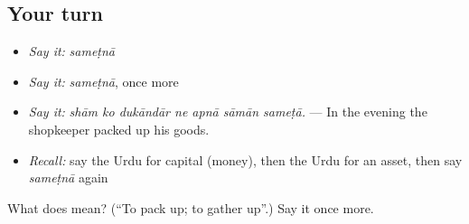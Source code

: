 \subsection*{Your turn}
\begin{itemize}
\raggedright
  \item \emph{Say it:} \emph{sameṭnā}
  \item \emph{Say it:} \emph{sameṭnā}, once more
  \item \emph{Say it:} \emph{shām ko dukāndār ne apnā sāmān sameṭā.} — In the evening the shopkeeper packed up his goods.
  \item \emph{Recall:} say the Urdu for capital (money), then the Urdu for an asset, then say \emph{sameṭnā} again
\end{itemize}

\begin{tcolorbox}[breakable,colback=teal!4,colframe=teal!35!black,title={Before you move on}]
What does  mean? (\textquotedblleft{}To pack up; to gather up\textquotedblright{}.) Say it once more.
\end{tcolorbox}
